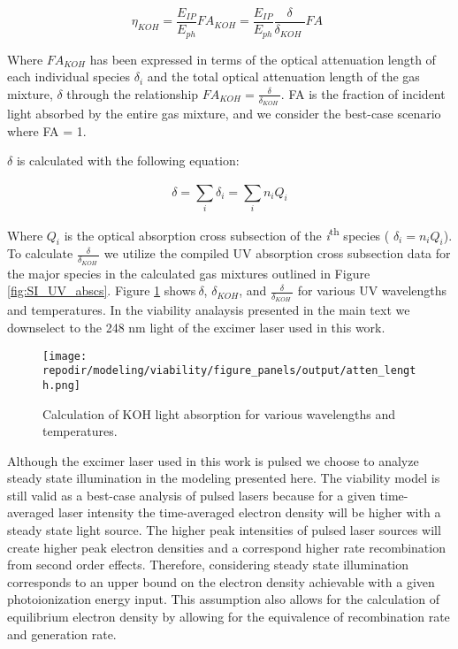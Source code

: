\begin{equation}
\eta_{KOH} = \frac{E_{IP}}{E_{ph}}FA_{KOH} = \frac{E_{IP}}{E_{ph}}\frac{\delta}{\delta_{KOH}\ }FA\ \ 
\end{equation}

Where \(FA_{KOH}\) has been expressed in terms of the optical attenuation length of each individual species \(\delta_{i}\) and the total optical attenuation length of the gas mixture, \(\delta\) through the relationship $FA_{KOH} = \frac{\delta}{\delta_{KOH}\ }$.  FA is the fraction of incident light absorbed by the entire gas mixture, and we consider the best-case scenario where FA = 1. 

\(\delta\) is calculated with the following equation:

\begin{equation}
\delta = \sum_{i}^{}\delta_{i} = \sum_{i}^{}{n_{i}Q_{i}}
\end{equation}

Where \(Q_{i}\) is the optical absorption cross subsection of the \emph{i}\textsuperscript{th} species ( \(\delta_{i} = n_{i}Q_{i}\)). To calculate \(\frac{\delta}{\delta_{KOH}\ }\) we utilize the compiled UV absorption cross subsection data for the major species in the calculated gas mixtures outlined in Figure \ref{fig:SI_UV_abscs}. Figure \ref{fig:SI_atten_length} shows\(\ \delta\), \(\delta_{KOH}\), and \(\frac{\delta}{\delta_{KOH}\ }\) for various UV wavelengths and temperatures. In the viability analaysis presented in the main text we downselect to the 248 nm light of the excimer laser used in this work.


\begin{figure}[ht]
    \centering
    \texttt{[image: \\repodir/modeling/viability/figure\_panels/output/atten\_length.png]}
    \caption{Calculation of KOH light absorption for various wavelengths and temperatures.}
    \label{fig:SI_atten_length}
\end{figure}


Although the excimer laser used in this work is pulsed we choose to analyze steady state illumination in the modeling presented here. The viability model is still valid as a best-case analysis of pulsed lasers because for a given time-averaged laser intensity the time-averaged electron density will be higher with a steady state light source. The higher peak intensities of pulsed laser sources will create higher peak electron densities and a correspond higher rate recombination from second order effects. Therefore, considering steady state illumination corresponds to an upper bound on the electron density achievable with a given photoionization energy input. This assumption also allows for the calculation of equilibrium electron density by allowing for the equivalence of recombination rate and generation rate.


